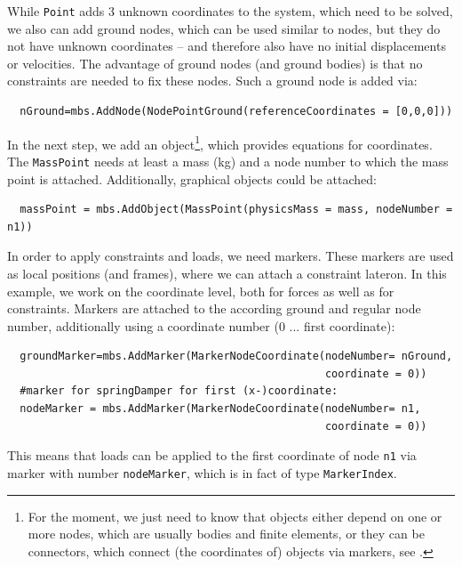 %
While \texttt{Point} adds 3 unknown coordinates to the system, which need to be solved, we also can add ground nodes, which can be used similar to nodes, but they do not have unknown coordinates -- and therefore also have no initial displacements or velocities. The advantage of ground nodes (and ground bodies) is that no constraints are needed to fix these nodes.
%
Such a ground node is added via:
\pythonstyle\begin{lstlisting}
  nGround=mbs.AddNode(NodePointGround(referenceCoordinates = [0,0,0]))
\end{lstlisting}
%
In the next step, we add an object\footnote{For the moment, we just need to know that objects either depend on one or more nodes, which are usually bodies and finite elements, or they can be connectors, which connect (the coordinates of) objects via markers, see .}, which provides equations for coordinates. The \texttt{MassPoint} needs at least a mass (kg) and a node number to which the mass point is attached. Additionally, graphical objects could be attached:
\pythonstyle\begin{lstlisting}
  massPoint = mbs.AddObject(MassPoint(physicsMass = mass, nodeNumber = n1))
\end{lstlisting}
%
In order to apply constraints and loads, we need markers. These markers are used as local positions (and frames), where we can attach a constraint lateron. In this example, we work on the coordinate level, both for forces as well as for constraints.
Markers are attached to the according ground and regular node number, additionally using a coordinate number (0 ... first coordinate):
\pythonstyle\begin{lstlisting}
  groundMarker=mbs.AddMarker(MarkerNodeCoordinate(nodeNumber= nGround, 
                                                  coordinate = 0))
  #marker for springDamper for first (x-)coordinate:
  nodeMarker = mbs.AddMarker(MarkerNodeCoordinate(nodeNumber= n1, 
                                                  coordinate = 0))
\end{lstlisting}
This means that loads can be applied to the first coordinate of node \texttt{n1} via marker with number \texttt{nodeMarker},
which is in fact of type \texttt{MarkerIndex}.

